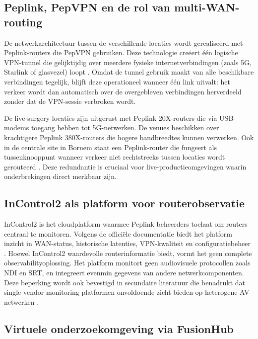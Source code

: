 \subsection{Peplink, PepVPN en de rol van multi-WAN-routing}

De netwerkarchitectuur tussen de verschillende locaties wordt gerealiseerd met Peplink-routers die PepVPN gebruiken. Deze technologie creëert één logische VPN-tunnel die gelijktijdig over meerdere fysieke internetverbindingen (zoals 5G, Starlink of glasvezel) loopt \autocite{Peplink2023}. Omdat de tunnel gebruik maakt van alle beschikbare verbindingen tegelijk, blijft deze operationeel wanneer één link uitvalt: het verkeer wordt dan automatisch over de overgebleven verbindingen herverdeeld zonder dat de VPN-sessie verbroken wordt. 

De live-surgery locaties zijn uitgerust met Peplink 20X-routers die via USB-modems toegang hebben tot 5G-netwerken. De venues beschikken over krachtigere Peplink 380X-routers die hogere bandbreedtes kunnen verwerken. Ook in de centrale site in Bornem staat een Peplink-router die fungeert als tussenknooppunt wanneer verkeer niet rechtstreeks tussen locaties wordt gerouteerd \autocite{VanRenterghem2025}. Deze redundantie is cruciaal voor live-productieomgevingen waarin onderbrekingen direct merkbaar zijn.

\subsection{InControl2 als platform voor routerobservatie}

InControl2 is het cloudplatform waarmee Peplink beheerders toelaat om routers centraal te monitoren. Volgens de officiële documentatie biedt het platform inzicht in WAN-status, historische latenties, VPN-kwaliteit en configuratiebeheer \autocite{Peplink2023}. Hoewel InControl2 waardevolle routerinformatie biedt, vormt het geen complete observabilityoplossing. Het platform monitort geen audiovisuele protocollen zoals NDI en SRT, en integreert evenmin gegevens van andere netwerkcomponenten. Deze beperking wordt ook bevestigd in secundaire literatuur die benadrukt dat single-vendor monitoring platformen onvoldoende zicht bieden op heterogene AV-netwerken \autocite{Elradi2025}.

\subsection{Virtuele onderzoekomgeving via FusionHub}

